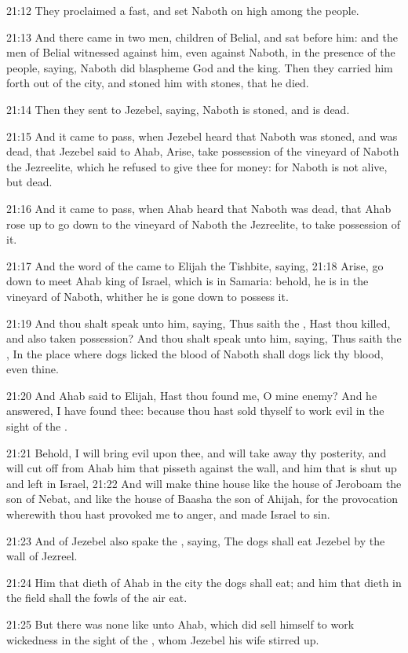 21:12 They proclaimed a fast, and set Naboth on high among the people.

21:13 And there came in two men, children of Belial, and sat before
him: and the men of Belial witnessed against him, even against Naboth,
in the presence of the people, saying, Naboth did blaspheme God and
the king. Then they carried him forth out of the city, and stoned him
with stones, that he died.

21:14 Then they sent to Jezebel, saying, Naboth is stoned, and is
dead.

21:15 And it came to pass, when Jezebel heard that Naboth was stoned,
and was dead, that Jezebel said to Ahab, Arise, take possession of the
vineyard of Naboth the Jezreelite, which he refused to give thee for
money: for Naboth is not alive, but dead.

21:16 And it came to pass, when Ahab heard that Naboth was dead, that
Ahab rose up to go down to the vineyard of Naboth the Jezreelite, to
take possession of it.

21:17 And the word of the \LORD came to Elijah the Tishbite, saying,
21:18 Arise, go down to meet Ahab king of Israel, which is in Samaria:
behold, he is in the vineyard of Naboth, whither he is gone down to
possess it.

21:19 And thou shalt speak unto him, saying, Thus saith the \LORD, Hast
thou killed, and also taken possession? And thou shalt speak unto him,
saying, Thus saith the \LORD, In the place where dogs licked the blood
of Naboth shall dogs lick thy blood, even thine.

21:20 And Ahab said to Elijah, Hast thou found me, O mine enemy? And
he answered, I have found thee: because thou hast sold thyself to work
evil in the sight of the \LORD.

21:21 Behold, I will bring evil upon thee, and will take away thy
posterity, and will cut off from Ahab him that pisseth against the
wall, and him that is shut up and left in Israel, 21:22 And will make
thine house like the house of Jeroboam the son of Nebat, and like the
house of Baasha the son of Ahijah, for the provocation wherewith thou
hast provoked me to anger, and made Israel to sin.

21:23 And of Jezebel also spake the \LORD, saying, The dogs shall eat
Jezebel by the wall of Jezreel.

21:24 Him that dieth of Ahab in the city the dogs shall eat; and him
that dieth in the field shall the fowls of the air eat.

21:25 But there was none like unto Ahab, which did sell himself to
work wickedness in the sight of the \LORD, whom Jezebel his wife
stirred up.

